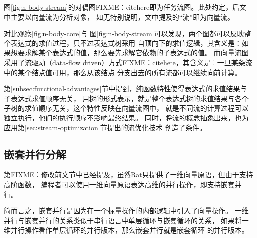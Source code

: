 图\ref{fig:n-body-stream}的对偶图FIXME：citehere即为任务流图。此处约定，后文中主要以向量流为分析对象，
如无特别说明，文中提及的“流”即为向量流。

对比观察\ref{fig:n-body-core}与
图\ref{fig:n-body-stream}可以发现，两个图都可以反映整个表达式的求值过程，只不过表达式树采用
自顶向下的求值逻辑，其含义是：如果想要求解某个表达式的值，那么要先求解它依赖的子表达式的值。
而向量流图采用了流驱动（data-flow driven）方式FIXME：citehere，其含义是：一旦某条流中的某个结点值可用，那么从该结点
分支出去的所有流都可以继续向前计算。

第\ref{subsec:functional-advantages}节中提到，纯函数特性使得表达式的求值结果与子表达式求值顺序无关，
用树的形式表示，就是整个表达式树的求值结果与各个子树的求值顺序无关，这个特性反映在向量流图中，
就是不同流的计算过程可以独立执行，他们的执行顺序不影响最终结果。
同时，将流的概念抽象出来，也为应用第\ref{sec:stream-optimization}节提出的流优化技术
创造了条件。

\subsection{嵌套并行分解}\label{subsec:np-decomposition}
第FIXME：修改前文节中已经提及，虽然Rat只提供了一维向量原语，但由于支持高阶函数，
编程者可以使用一维向量原语表达高维的并行操作，即支持嵌套并行。

简而言之，嵌套并行是因为在一个标量操作的内部逻辑中引入了向量操作。
一维并行与嵌套并行的关系类似于串行语言中单层循环与嵌套循环的关系，
如果将一维并行操作看作单层循环的并行版本，那么嵌套并行就是嵌套循环
的并行版本。
\begin{quotation}
\end{quotation}

